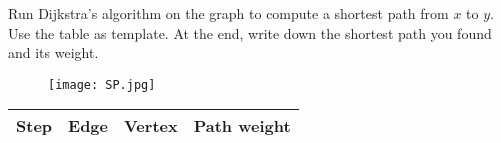 \documentclass[letterpaper,9pt,addpoints]{exam}
\begin{document}
\begin{questions}
 \newpage



\question[25]
Run Dijkstra's algorithm on the graph to compute a shortest path from $x$ to $y$. Use the table as template. At the end, write down the shortest path you found and its weight.
\begin{figure}[h] %
  \center
  \texttt{[image: SP.jpg]}
  \end{figure}
\begin{table}[h]
  \centering
\begin{tabular}{p{}p{}p{}p{}}
Step& Edge& Vertex& Path weight\\
\hline 
\end{tabular}
\end{table}



\end{questions}
\end{document}
